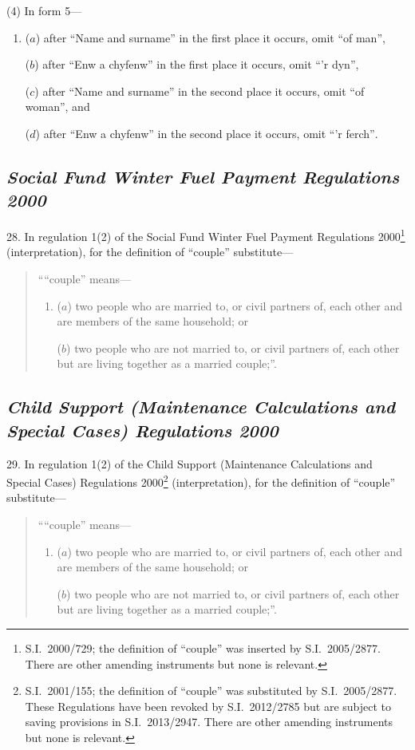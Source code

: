 \documentclass[12pt,a4paper]{article}
\begin{document}
(4) In form 5—
\begin{enumerate}\item[]
($a$) after “Name and surname” in the first place it occurs, omit “of man”,

($b$) after \foreignlanguage{welsh}{“Enw a chyfenw”} in the first place it occurs, omit \foreignlanguage{welsh}{“’r dyn”,}

($c$) after “Name and surname” in the second place it occurs, omit “of woman”, and

($d$) after \foreignlanguage{welsh}{“Enw a chyfenw”} in the second place it occurs, omit \foreignlanguage{welsh}{“’r ferch”}.
\end{enumerate}

\subsection*{\itshape Social Fund Winter Fuel Payment Regulations 2000}

28.  In regulation 1(2) of the Social Fund Winter Fuel Payment Regulations 2000\footnote{S.I.~2000/729; the definition of “couple” was inserted by S.I.~2005/2877. There are other amending instruments but none is relevant.} (interpretation), for the definition of “couple” substitute—
\begin{quotation}
““couple” means—
\begin{enumerate}\item[]
($a$) 
two people who are married to, or civil partners of, each other and are members of the same household; or

($b$) 
two people who are not married to, or civil partners of, each other but are living together as a married couple;”.
\end{enumerate}
\end{quotation}

\subsection*{\itshape Child Support (Maintenance Calculations and Special Cases) Regulations 2000}

29.  In regulation 1(2) of the Child Support (Maintenance Calculations and Special Cases) Regulations 2000\footnote{S.I.~2001/155; the definition of “couple” was substituted by S.I.~2005/2877. These Regulations have been revoked by S.I.~2012/2785 but are subject to saving provisions in S.I.~2013/2947. There are other amending instruments but none is relevant.} (interpretation), for the definition of “couple” substitute—
\begin{quotation}
““couple” means—
\begin{enumerate}\item[]
($a$) 
two people who are married to, or civil partners of, each other and are members of the same household; or

($b$) 
two people who are not married to, or civil partners of, each other but are living together as a married couple;”.
\end{enumerate}
\end{quotation}
\end{document}
